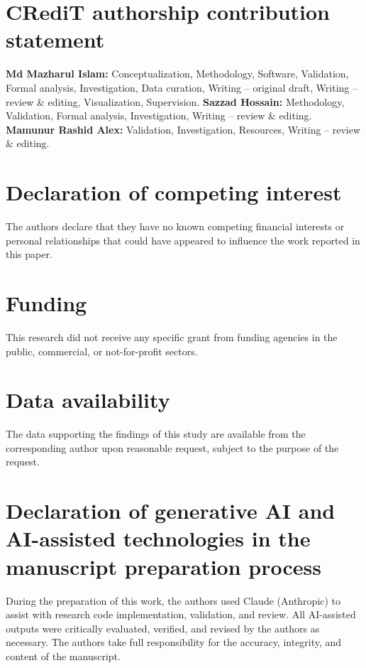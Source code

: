 \section*{CRediT authorship contribution statement}
\textbf{Md Mazharul Islam:} Conceptualization, Methodology, Software, Validation, Formal analysis, Investigation, Data curation, Writing -- original draft, Writing -- review \& editing, Visualization, Supervision. \textbf{Sazzad Hossain:} Methodology, Validation, Formal analysis, Investigation, Writing -- review \& editing. \textbf{Mamunur Rashid Alex:} Validation, Investigation, Resources, Writing -- review \& editing.

\section*{Declaration of competing interest}
The authors declare that they have no known competing financial interests or personal relationships that could have appeared to influence the work reported in this paper. %

\section*{Funding}
This research did not receive any specific grant from funding agencies in the public, commercial, or not-for-profit sectors. %

\section*{Data availability}
The data supporting the findings of this study are available from the corresponding author upon reasonable request, subject to the purpose of the request.

\section*{Declaration of generative AI and AI-assisted technologies in the manuscript preparation process}
During the preparation of this work, the authors used Claude (Anthropic) to assist with research code implementation, validation, and review. All AI-assisted outputs were critically evaluated, verified, and revised by the authors as necessary. The authors take full responsibility for the accuracy, integrity, and content of the manuscript.
